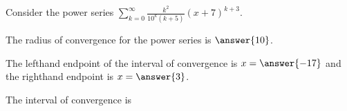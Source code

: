 \documentclass{ximera}
\author{Jim Talamo}
\begin{document}
\begin{exercise}
Consider the power series $\sum_{k=0}^{\infty} \frac{k^2 }{10^k (k+5)}(x+7)^{k+3}$.

The radius of convergence for the power series is $\answer{10}$.

The lefthand endpoint of the interval of convergence is $x=\answer{-17}$ and the righthand endpoint is $x=\answer{3}$.

\begin{exercise}
The interval of convergence is 

\begin{multipleChoice}
\choice{$[-17,3)$}
\choice{$(-17,3]$}
\choice{$[-17,3]$}
\end{multipleChoice}
\end{exercise}

\end{exercise}
\end{document}
